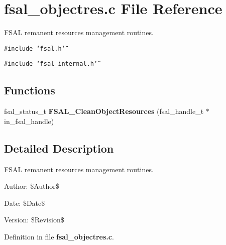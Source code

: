 \section{fsal\_\-objectres.c File Reference}
\label{fsal__objectres_8c}
FSAL remanent resources management routines. 

{\tt \#include \char`\"{}fsal.h\char`\"{}}\par
{\tt \#include \char`\"{}fsal\_\-internal.h\char`\"{}}\par
\subsection*{Functions}
\begin{CompactItemize}
\item 
fsal\_\-status\_\-t {\bf FSAL\_\-Clean\-Object\-Resources} (fsal\_\-handle\_\-t $\ast$in\_\-fsal\_\-handle)\label{fsal__objectres_8c_a0}

\end{CompactItemize}


\subsection{Detailed Description}
FSAL remanent resources management routines. 

\begin{Desc}
\item[Author:]\$Author\$ \end{Desc}
\begin{Desc}
\item[Date:]\$Date\$ \end{Desc}
\begin{Desc}
\item[Version:]\$Revision\$ \end{Desc}


Definition in file {\bf fsal\_\-objectres.c}.